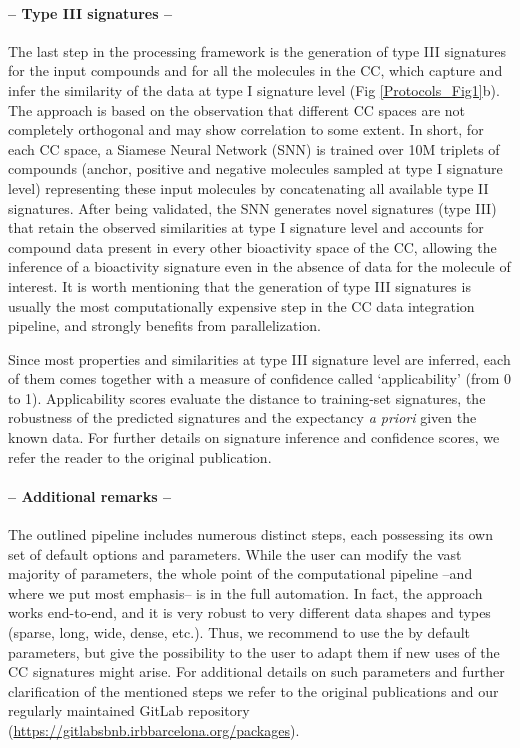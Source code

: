 \paragraph{-- Type III signatures --} \leavevmode


The last step in the processing framework is the generation of type III signatures for the input compounds and for all the molecules in the CC, which capture and infer the similarity of the data at type I signature level (Fig \ref{Protocols_Fig1}b). The approach is based on the observation that different CC spaces are not completely orthogonal and may show correlation to some extent. In short, for each CC space, a Siamese Neural Network (SNN) is trained over 10M triplets of compounds (anchor, positive and negative molecules sampled at type I signature level) representing these input molecules by concatenating all available type II signatures. After being validated, the SNN generates novel signatures (type III) that retain the observed similarities at type I signature level and accounts for compound data present in every other bioactivity space of the CC, allowing the inference of a bioactivity signature even in the absence of data for the molecule of interest. It is worth mentioning that the generation of type III signatures is usually the most computationally expensive step in the CC data integration pipeline, and strongly benefits from parallelization.

Since most properties and similarities at type III signature level are inferred, each of them comes together with a measure of confidence called ‘applicability’ (from 0 to 1). Applicability scores evaluate the distance to training-set signatures, the robustness of the predicted signatures and the expectancy \textit{a priori} given the known data. For further details on signature inference and confidence scores, we refer the reader to the original publication\cite{bertoni_bioactivity_2021}.

\paragraph{-- Additional remarks --} \leavevmode

The outlined pipeline includes numerous distinct steps, each possessing its own set of default options and parameters. While the user can modify the vast majority of parameters, the whole point of the computational pipeline –and where we put most emphasis– is in the full automation. In fact, the approach works end-to-end, and it is very robust to very different data shapes and types (sparse, long, wide, dense, etc.). Thus, we recommend to use the by default parameters, but give the possibility to the user to adapt them if new uses of the CC signatures might arise. For additional details on such parameters and further clarification of the mentioned steps we refer to the original publications\cite{duran-frigola_extending_2020, bertoni_bioactivity_2021} and our regularly maintained GitLab repository (\href{https://gitlabsbnb.irbbarcelona.org/packages}{https://gitlabsbnb.irbbarcelona.org/packages}). 

